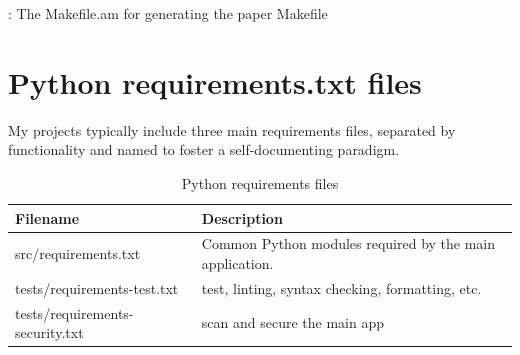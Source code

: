 \begin{mybox}{\thetcbcounter: The Makefile.am for generating the paper Makefile}
    
\end{mybox}
\vspace{2mm}

\section{\label{sec:req}Python requirements.txt files}

\justifying
My projects typically include three main requirements files, separated by functionality and named to foster a self-documenting paradigm.

\begin{table}[ht]
    \centering
    \begin{tabular}{|l|l|}\hline
        Filename & Description \\\hline
        src/requirements.txt & Common Python modules required by the main application.    \\\hline
        tests/requirements-test.txt & test, linting, syntax checking, formatting, etc.    \\\hline
        tests/requirements-security.txt  &  scan and secure the main app   \\\hline
    \end{tabular}
    \caption{Python requirements files}
    \label{Requirements}
\end{table}

\clearpage
\begin{versionhistory}
\end{versionhistory}

\clearpage




